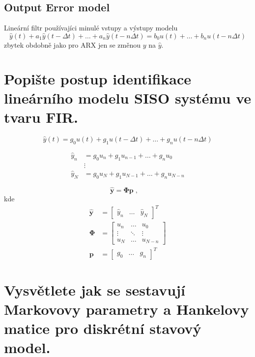 \documentclass{article}
\begin{document}
	\subsection{Output Error model}
	Lineární filtr používajíci minulé vstupy a výstupy modelu
	\begin{equation}
		\hat{y}(t) + a_1 \hat{y}(t-\Delta t) + \dots + a_n \hat{y}(t-n\Delta t)
		=
		b_0 u(t) + \dots + b_n u(t-n\Delta t)
	\end{equation}
	zbytek obdobně jako pro ARX jen se změnou $y$ na $\hat{y}$.


	\section{Popište postup identifikace lineárního modelu SISO systému ve tvaru FIR. }

	\begin{equation}
		\hat{y}(t) = g_0 u(t) + g_1 u(t-\Delta t) + \dots + g_n u(t-n\Delta t)
	\end{equation}

	\begin{align}
		\hat{y}_n &= g_0 u_n + g_1 u_{n-1} + \dots + g_n u_0 \\
		&\vdots \\
		\hat{y}_N &= g_0 u_{N} + g_1 u_{N-1} + \dots + g_n u_{N-n}
	\end{align}

	\begin{equation}
		\bm{\hat{y}} = \bm{\Phi} \bm{p}
		\;,\quad 
	\end{equation}
	kde
	\begin{align*}
		\bm{\hat{y}} &= \begin{bmatrix} \hat{y}_n & \dots & \hat{y}_N \end{bmatrix}^T
		\\ 
		\bm{\Phi}
		&=
		\begin{bmatrix}
			u_n & \dots & u_0 \\
			\vdots & \ddots & \vdots \\
			u_N & \dots & u_{N-n} 
		\end{bmatrix}
		\\ 
		\bm{p} &= \begin{bmatrix} g_0 & \dots & g_n \end{bmatrix}^T
	\end{align*}

	\section{Vysvětlete jak se sestavují Markovovy parametry a Hankelovy matice pro diskrétní stavový model. }
\end{document}
